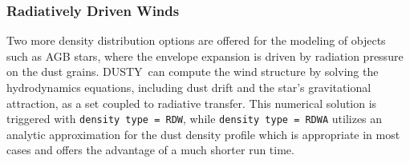 \documentclass[11pt]{article}
\def\D    {{\sf DUSTY}}
\begin{document}
\subsubsection{Radiatively Driven Winds}
\label{winds}

Two more density distribution options are offered for the modeling of
objects such as AGB stars, where the envelope expansion is driven by
radiation pressure on the dust grains. \D\ can compute the wind
structure by solving the hydrodynamics equations, including dust drift
and the star's gravitational attraction, as a set coupled to radiative
transfer.  This numerical solution is triggered with {\tt density type
  = RDW}, while {\tt density type = RDWA} utilizes an
analytic approximation for the dust density profile which is
appropriate in most cases and offers the advantage of a much shorter
run time.
\end{document}
